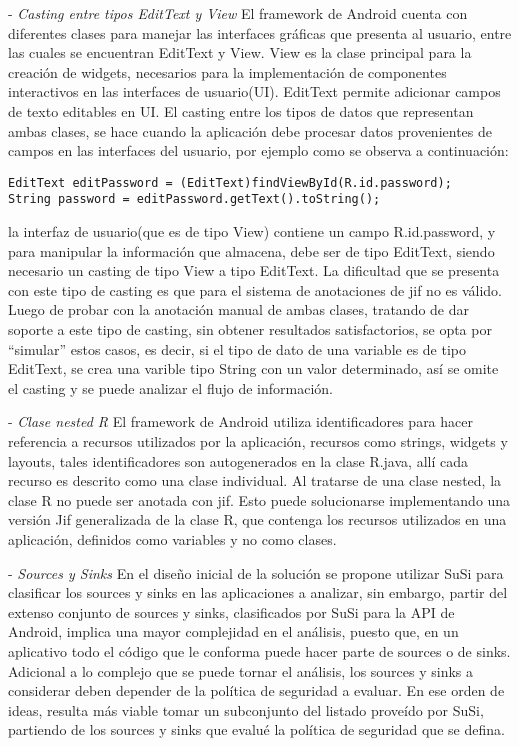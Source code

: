 - \textit{Casting entre tipos EditText y View}\newline
El framework de Android cuenta con diferentes clases para manejar las interfaces
gráficas que presenta al usuario, entre las cuales se encuentran EditText y
View. View es la clase principal para la creación de widgets, necesarios para la
implementación de componentes interactivos en las interfaces de usuario(UI).
EditText permite adicionar campos de texto editables en UI. El casting entre los
tipos de datos que representan ambas clases, se hace cuando la aplicación debe
procesar datos provenientes de campos en las interfaces del usuario, por ejemplo
como se observa a continuación:
\begin{lstlisting}
EditText editPassword = (EditText)findViewById(R.id.password);
String password = editPassword.getText().toString();
\end{lstlisting}
la interfaz de usuario(que es de tipo View) contiene un campo R.id.password, y
para manipular la información que almacena, debe ser de tipo EditText, siendo
necesario un casting de tipo View a tipo EditText. La dificultad que se presenta
con este tipo de casting es que para el sistema de anotaciones de jif no es
válido. Luego de probar con la anotación manual de ambas clases, tratando de
dar soporte a este tipo de casting, sin obtener resultados satisfactorios, se
opta por ``simular'' estos casos, es decir, si el tipo de dato de una variable
es de tipo EditText, se crea una varible tipo String con un valor determinado,
así se omite el casting y se puede analizar el flujo de información.

- \textit{Clase nested R}\newline
El framework de Android utiliza identificadores para hacer referencia a recursos
utilizados por la aplicación, recursos como strings, widgets y layouts, tales
identificadores son autogenerados en la clase R.java, allí cada recurso es
descrito como una clase individual. Al tratarse de una clase nested, la clase R
no puede ser anotada con jif. Esto puede solucionarse implementando una
versión Jif generalizada de la clase R, que contenga los recursos utilizados en
una aplicación, definidos como variables y no como clases.

- \textit{Sources y Sinks}\newline
En el diseño inicial de la solución se propone utilizar SuSi para clasificar
los sources y sinks en las aplicaciones a analizar, sin embargo, partir del
extenso conjunto de sources y sinks, clasificados por SuSi para la API de
Android, implica una mayor complejidad en el análisis, puesto que, en un
aplicativo todo el código que le conforma puede hacer parte de sources o de
sinks. Adicional a lo complejo que se puede tornar el análisis, los sources y
sinks a considerar deben depender de la política de seguridad a evaluar. En ese
orden de ideas, resulta más viable tomar un subconjunto del listado proveído por
SuSi, partiendo de los sources y sinks que evalué la política de seguridad que
se defina.

